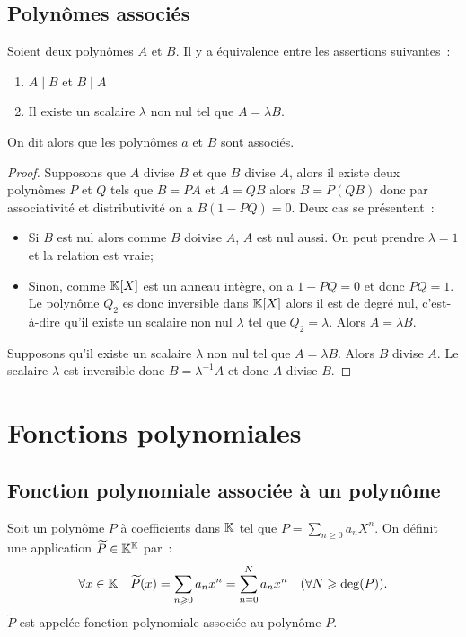 \subsection{Polynômes associés}

\begin{prop}
  Soient deux polynômes \(A\) et \(B\). Il y a équivalence entre les assertions suivantes~:
  \begin{enumerate}
    \item \(A\mid{}B\) et \(B\mid{}A\)
    \item Il existe un scalaire \(\lambda\) non nul tel que \(A=\lambda B\).
  \end{enumerate}
  On dit alors que les polynômes \(a\) et \(B\) sont associés.
\end{prop}

\begin{proof}
  Supposons que \(A\) divise \(B\) et que \(B\) divise \(A\), alors il existe deux polynômes \(P\) et \(Q\) tels que \(B=PA\) et \(A=QB\) alors \(B=P(QB)\) donc par associativité et distributivité on a \(B(1-PQ)=0\). Deux cas se présentent~:
  \begin{itemize}
    \item Si \(B\) est nul alors comme \(B\) doivise \(A\), \(A\) est nul aussi. On peut prendre \(\lambda=1\) et la relation est vraie;
    \item Sinon, comme \(\mathbb{K}[X]\) est un anneau intègre, on a \(1-PQ=0\) et donc \(PQ=1\). Le polynôme \(Q_2\) es donc inversible dans \(\mathbb{K}[X]\) alors il est de degré nul, c'est-à-dire qu'il existe un scalaire non nul \(\lambda\) tel que \(Q_2=\lambda\). Alors \(A=\lambda B\).
  \end{itemize}

  Supposons qu'il existe un scalaire \(\lambda\) non nul tel que \(A=\lambda B\). Alors \(B\) divise \(A\). Le scalaire \(\lambda\) est inversible donc \(B=\lambda^{-1}A\) et donc \(A\) divise \(B\).
\end{proof}

\section{Fonctions polynomiales}

\subsection{Fonction polynomiale associée à un polynôme}

\begin{defdef}
  Soit un polynôme \(P\) à coefficients dans \(\mathbb{K}\) tel que \(P=\sum_{n \geqslant 0}a_n X^n\). On définit une application \(\widetilde{P} \in \mathbb{K}^{\mathbb{K}}\) par~:
  \begin{equation}
    \forall x \in \mathbb{K} \quad \widetilde{P}(x) = \sum_{n \geqslant 0} a_n x^n=\sum_{n=0}^N a_n x^n \quad (\forall N \geqslant \deg(P)).
  \end{equation}
  \(\widetilde{P}\) est appelée fonction polynomiale associée au polynôme \(P\).
\end{defdef}

